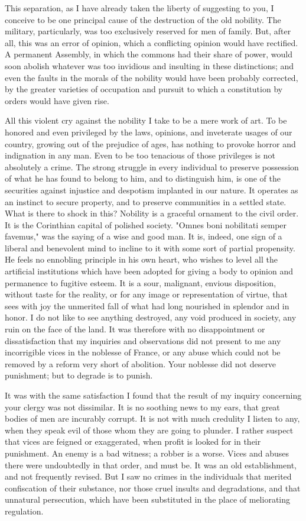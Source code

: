 This separation, as I have already taken the liberty of suggesting to you, I conceive to be one principal cause of the destruction of the old nobility. The military, particularly, was too exclusively reserved for men of family. But, after all, this was an error of opinion, which a conflicting opinion would have rectified. A permanent Assembly, in which the commons had their share of power, would soon abolish whatever was too invidious and insulting in these distinctions; and even the faults in the morals of the nobility would have been probably corrected, by the greater varieties of occupation and pursuit to which a constitution by orders would have given rise.

All this violent cry against the nobility I take to be a mere work of art. To be honored and even privileged by the laws, opinions, and inveterate usages of our country, growing out of the prejudice of ages, has nothing to provoke horror and indignation in any man. Even to be too tenacious of those privileges is not absolutely a crime. The strong struggle in every individual to preserve possession of what he has found to belong to him, and to distinguish him, is one of the securities against injustice and despotism implanted in our nature. It operates as an instinct to secure property, and to preserve communities in a settled state. What is there to shock in this? Nobility is a graceful ornament to the civil order. It is the Corinthian capital of polished society. "Omnes boni nobilitati semper favemus," was the saying of a wise and good man. It is, indeed, one sign of a liberal and benevolent mind to incline to it with some sort of partial propensity. He feels no ennobling principle in his own heart, who wishes to level all the artificial institutions which have been adopted for giving a body to opinion and permanence to fugitive esteem. It is a sour, malignant, envious disposition, without taste for the reality, or for any image or representation of virtue, that sees with joy the unmerited fall of what had long nourished in splendor and in honor. I do not like to see anything destroyed, any void produced in society, any ruin on the face of the land. It was therefore with no disappointment or dissatisfaction that my inquiries and observations did not present to me any incorrigible vices in the noblesse of France, or any abuse which could not be removed by a reform very short of abolition. Your noblesse did not deserve punishment; but to degrade is to punish.

It was with the same satisfaction I found that the result of my inquiry concerning your clergy was not dissimilar. It is no soothing news to my ears, that great bodies of men are incurably corrupt. It is not with much credulity I listen to any, when they speak evil of those whom they are going to plunder. I rather suspect that vices are feigned or exaggerated, when profit is looked for in their punishment. An enemy is a bad witness; a robber is a worse. Vices and abuses there were undoubtedly in that order, and must be. It was an old establishment, and not frequently revised. But I saw no crimes in the individuals that merited confiscation of their substance, nor those cruel insults and degradations, and that unnatural persecution, which have been substituted in the place of meliorating regulation.

